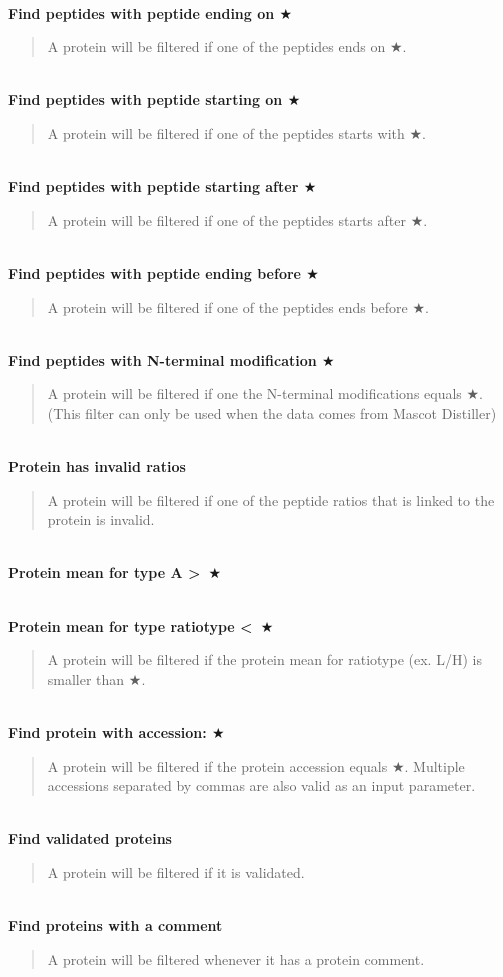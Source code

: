 \documentclass[11pt,a4paper,oneside,notitlepage]{book}
\begin{document}
\\
\textbf{Find peptides with peptide ending on $\bigstar$}
\begin{quotation}A protein will be filtered if one of the peptides ends on $\bigstar$.
\end{quotation}
\\
\textbf{Find peptides with peptide starting on $\bigstar$}
\begin{quotation}A protein will be filtered if one of the peptides starts with $\bigstar$.
\end{quotation}
\\
\textbf{Find peptides with peptide starting after $\bigstar$}
\begin{quotation}A protein will be filtered if one of the peptides starts after $\bigstar$.
\end{quotation}
\\
\textbf{Find peptides with peptide ending before $\bigstar$}
\begin{quotation}A protein will be filtered if one of the peptides ends before $\bigstar$.
\end{quotation}
\\
\textbf{Find peptides with N-terminal modification $\bigstar$}
\begin{quotation}A protein will be filtered if one the N-terminal modifications equals $\bigstar$. (This filter can only be used when the data comes from Mascot Distiller)
\end{quotation}
\\
\textbf{Protein has invalid ratios}
\begin{quotation}A protein will be filtered if one of the peptide ratios that is linked to the protein is invalid.
\end{quotation}
\\
\textbf{Protein mean for type A \textgreater \ $\bigstar$}
\begin{quotation}}A protein will be filtered if the protein mean for A is larger than $\bigstar$.
\end{quotation}
\\
\textbf{Protein mean for type ratiotype \textless \ $\bigstar$}
\begin{quotation}A protein will be filtered if the protein mean for ratiotype (ex. L/H) is smaller than $\bigstar$.
\end{quotation}
\\
\textbf{Find protein with accession: $\bigstar$}
\begin{quotation}A protein will be filtered if the protein accession equals $\bigstar$. Multiple accessions separated by commas are also valid as an input parameter.
\end{quotation}
\\
\textbf{Find validated proteins}
\begin{quotation}A protein will be filtered if it is validated.
\end{quotation}
\\
\textbf{Find proteins with a comment}
\begin{quotation}A protein will be filtered whenever it has a protein comment.
\end{quotation}
\\
\end{document}
